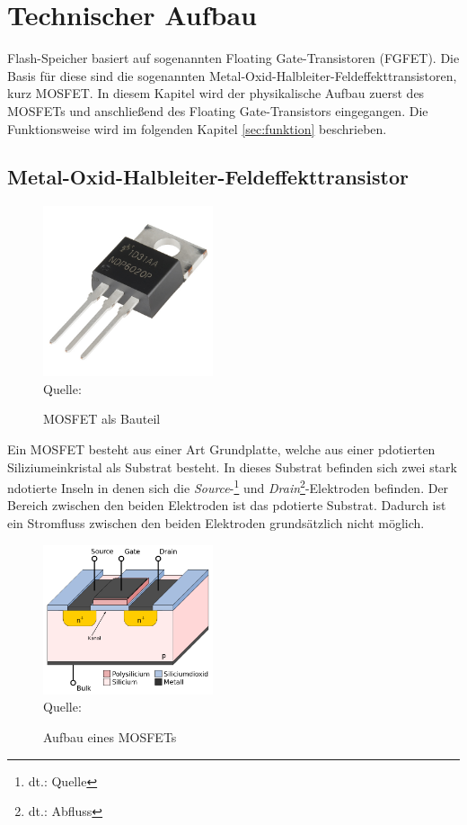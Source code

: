 \section{Technischer Aufbau}
Flash-Speicher basiert auf sogenannten Floating Gate-Transistoren (FGFET). Die Basis für diese sind die sogenannten Metal-Oxid-Halbleiter-Feldeffekttransistoren, kurz MOSFET. In diesem Kapitel wird der physikalische Aufbau zuerst des MOSFETs und anschließend des Floating Gate-Transistors eingegangen. Die Funktionsweise wird im folgenden Kapitel \ref{sec:funktion} beschrieben.

\subsection{Metal-Oxid-Halbleiter-Feldeffekttransistor}
\begin{figure}[h]
    \centering
    \caption{MOSFET als Bauteil}
    \includegraphics[width=5cm]{sections/img/mosfet_bauteil}
    \label{fig:mosfet.bauteil}
    \\ Quelle: \cite{mosfetshop}
\end{figure}

Ein MOSFET besteht aus einer Art Grundplatte, welche aus einer \gls{pdotiert}en Siliziumeinkristal als Substrat besteht. In dieses Substrat befinden sich zwei stark \gls{ndotiert}e Inseln in denen sich die \emph{Source}-\footnote{dt.: Quelle} und \emph{Drain}\footnote{dt.: Abfluss}-Elektroden befinden. Der Bereich zwischen den beiden Elektroden ist das \gls{pdotiert}e Substrat. Dadurch ist ein Stromfluss zwischen den beiden Elektroden grundsätzlich nicht möglich.

\begin{figure}[h]
    \centering
    \caption{Aufbau eines MOSFETs}
    \includegraphics[width=5cm]{sections/img/mosfet_aufbau}
    \label{fig:mosfet.aufbau}
    \\ Quelle: \cite{mosfetwiki}
\end{figure}

